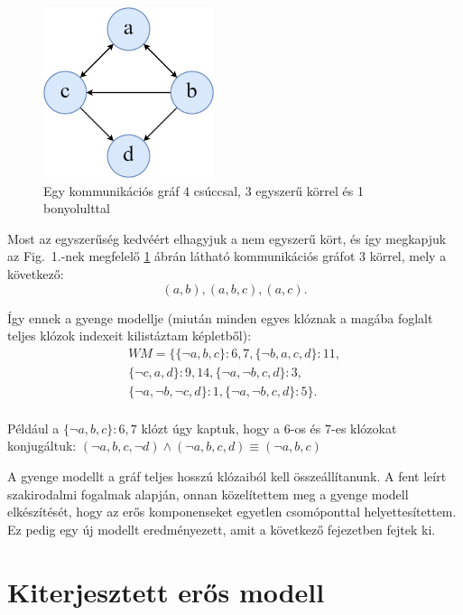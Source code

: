 \documentclass[
]{thesis-ekf}
\theoremstyle{definition}
\theoremstyle{remark}
\begin{document}
	\begin{figure}[!ht]
		\centering
		\includegraphics[width=5cm]{images/SYNASC2020_4node_7edge}
		\caption{Egy kommunikációs gráf 4 csúccsal, 3 egyszerű körrel és 1 bonyolulttal}
		\label{abra-synasc2020-4node7edge}
	\end{figure}

	Most az egyszerűség kedvéért elhagyjuk a nem egyszerű kört, és így megkapjuk az Fig.~1.-nek megfelelő \ref{abra-synasc2020-4node7edge} ábrán látható kommunikációs gráfot 3 körrel, mely a következő:
	\[ (a,b),(a,b,c),(a,c). \]
	
	Így ennek a gyenge modellje (miután minden egyes klóznak a magába foglalt teljes klózok indexeit kilistáztam \az{\eqref{eq-teljes-klozok}} képletből):
	\begin{equation*}
		\begin{split}
			WM=\{\{\neg a,b,c\} :6,7,\{\neg b,a,c,d\} :11, \\
			\{\neg c,a,d\} :9,14,\{\neg a,\neg b,c,d\} :3, \\
			\{\neg a,\neg b,\neg c,d\} :1,\{\neg a,\neg b,c,d\} :5\}. \\
		\end{split}
	\end{equation*}

	Például a $ \{\neg a,b,c\} :6,7 $ klózt úgy kaptuk, hogy a 6-os és 7-es klózokat konjugáltuk:
	$ (\neg a,b,c,\neg d)\wedge(\neg a,b,c,d)\equiv(\neg a,b,c) $
		
	A gyenge modellt a gráf teljes hosszú klózaiból kell összeállítanunk. A fent leírt szakirodalmi fogalmak alapján, onnan közelítettem meg a gyenge modell elkészítését, hogy az erős komponenseket egyetlen csomóponttal helyettesítettem. Ez pedig egy új modellt eredményezett, amit a következő fejezetben fejtek ki.
	
	\section{Kiterjesztett erős modell}\label{sec-esm}
\end{document}
